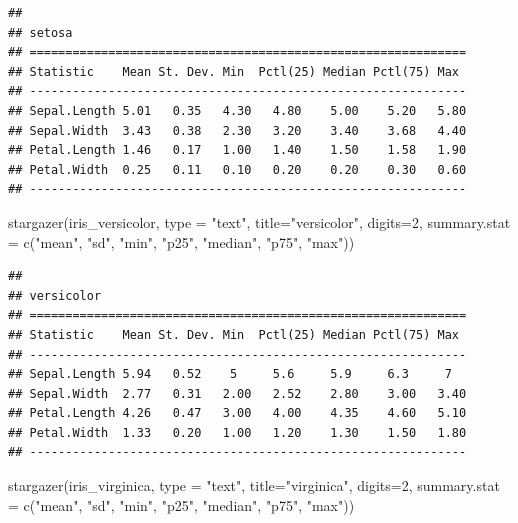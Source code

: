 \documentclass[
]{book}
\newenvironment{Shaded}{\begin{snugshade}}{\end{snugshade}}
\newcommand{\AttributeTok}[1]{\textcolor[rgb]{0.77,0.63,0.00}{#1}}
\newcommand{\DecValTok}[1]{\textcolor[rgb]{0.00,0.00,0.81}{#1}}
\newcommand{\FunctionTok}[1]{\textcolor[rgb]{0.00,0.00,0.00}{#1}}
\newcommand{\NormalTok}[1]{#1}
\newcommand{\StringTok}[1]{\textcolor[rgb]{0.31,0.60,0.02}{#1}}
\begin{document}
\begin{verbatim}
## 
## setosa
## =============================================================
## Statistic    Mean St. Dev. Min  Pctl(25) Median Pctl(75) Max 
## -------------------------------------------------------------
## Sepal.Length 5.01   0.35   4.30   4.80    5.00    5.20   5.80
## Sepal.Width  3.43   0.38   2.30   3.20    3.40    3.68   4.40
## Petal.Length 1.46   0.17   1.00   1.40    1.50    1.58   1.90
## Petal.Width  0.25   0.11   0.10   0.20    0.20    0.30   0.60
## -------------------------------------------------------------
\end{verbatim}

\begin{Shaded}
\begin{Highlighting}[]
\FunctionTok{stargazer}\NormalTok{(iris\_versicolor, }\AttributeTok{type =} \StringTok{"text"}\NormalTok{, }\AttributeTok{title=}\StringTok{"versicolor"}\NormalTok{, }\AttributeTok{digits=}\DecValTok{2}\NormalTok{,}
          \AttributeTok{summary.stat =} \FunctionTok{c}\NormalTok{(}\StringTok{"mean"}\NormalTok{, }\StringTok{"sd"}\NormalTok{, }\StringTok{"min"}\NormalTok{, }\StringTok{"p25"}\NormalTok{, }\StringTok{"median"}\NormalTok{, }\StringTok{"p75"}\NormalTok{, }\StringTok{"max"}\NormalTok{))}
\end{Highlighting}
\end{Shaded}

\begin{verbatim}
## 
## versicolor
## =============================================================
## Statistic    Mean St. Dev. Min  Pctl(25) Median Pctl(75) Max 
## -------------------------------------------------------------
## Sepal.Length 5.94   0.52    5     5.6     5.9     6.3     7  
## Sepal.Width  2.77   0.31   2.00   2.52    2.80    3.00   3.40
## Petal.Length 4.26   0.47   3.00   4.00    4.35    4.60   5.10
## Petal.Width  1.33   0.20   1.00   1.20    1.30    1.50   1.80
## -------------------------------------------------------------
\end{verbatim}

\begin{Shaded}
\begin{Highlighting}[]
\FunctionTok{stargazer}\NormalTok{(iris\_virginica, }\AttributeTok{type =} \StringTok{"text"}\NormalTok{, }\AttributeTok{title=}\StringTok{"virginica"}\NormalTok{, }\AttributeTok{digits=}\DecValTok{2}\NormalTok{,}
          \AttributeTok{summary.stat =} \FunctionTok{c}\NormalTok{(}\StringTok{"mean"}\NormalTok{, }\StringTok{"sd"}\NormalTok{, }\StringTok{"min"}\NormalTok{, }\StringTok{"p25"}\NormalTok{, }\StringTok{"median"}\NormalTok{, }\StringTok{"p75"}\NormalTok{, }\StringTok{"max"}\NormalTok{))}
\end{Highlighting}
\end{Shaded}
\end{document}
